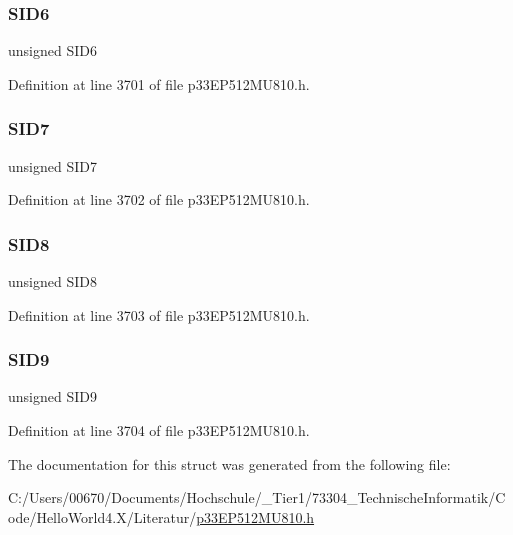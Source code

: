 \subsubsection{\texorpdfstring{S\+I\+D6}{SID6}}
{\footnotesize\ttfamily unsigned S\+I\+D6}



Definition at line 3701 of file p33\+E\+P512\+M\+U810.\+h.

\mbox{\label{structtag_c1_r_x_f0_s_i_d_b_i_t_s_a34097fb76decd431701fa2d86a22328e}} 
\subsubsection{\texorpdfstring{S\+I\+D7}{SID7}}
{\footnotesize\ttfamily unsigned S\+I\+D7}



Definition at line 3702 of file p33\+E\+P512\+M\+U810.\+h.

\mbox{\label{structtag_c1_r_x_f0_s_i_d_b_i_t_s_afe74894633244fdb0b0c01b4e8c522e7}} 
\subsubsection{\texorpdfstring{S\+I\+D8}{SID8}}
{\footnotesize\ttfamily unsigned S\+I\+D8}



Definition at line 3703 of file p33\+E\+P512\+M\+U810.\+h.

\mbox{\label{structtag_c1_r_x_f0_s_i_d_b_i_t_s_a33587704948067005c2a6a3ccc503c99}} 
\subsubsection{\texorpdfstring{S\+I\+D9}{SID9}}
{\footnotesize\ttfamily unsigned S\+I\+D9}



Definition at line 3704 of file p33\+E\+P512\+M\+U810.\+h.



The documentation for this struct was generated from the following file\+:\begin{DoxyCompactItemize}
\item 
C\+:/\+Users/00670/\+Documents/\+Hochschule/\+\_\+\+Tier1/73304\+\_\+\+Technische\+Informatik/\+Code/\+Hello\+World4.\+X/\+Literatur/\hyperlink{p33_e_p512_m_u810_8h}{p33\+E\+P512\+M\+U810.\+h}\end{DoxyCompactItemize}
